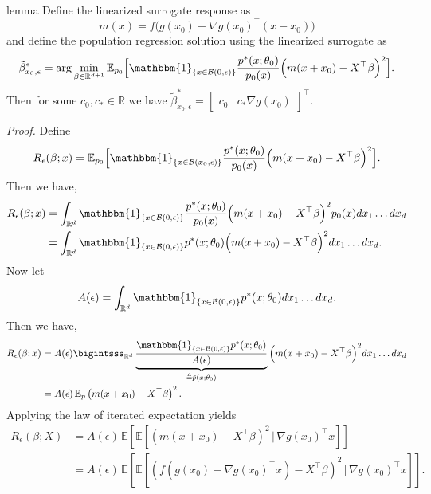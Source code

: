 \documentclass[11pt]{article}
\begin{document}
\begin{restatable}[Surrogate]{lemma}{} \label{lemma: surrogate problem} Define the linearized surrogate response as
\[m(x) = f\Big(g(x_0) + \nabla g(x_0)^{\top}(x-x_0)\Big)\]
and define the population regression solution using the linearized surrogate as 
\[\tilde{\beta}^*_{x_0, \epsilon} = \arg\min_{\beta \in \mathbb{R}^{d+1}}\mathbb{E}_{ p_{0}}\Big[\mathbbm{1}_{\{x \in \mathcal{B}(0, \epsilon)\}}\frac{p^*(x;\theta_0)}{p_{0}(x)}\Big(m(x + x_0) - X^{\top}\beta \Big)^2\Big].\]
Then for some $c_0, c_* \in \mathbb{R}$ we have $\tilde{\beta}^*_{x_0, \epsilon} = \begin{bmatrix}c_0  & c_*\nabla g(x_0) \end{bmatrix}^{\top}$. 
\end{restatable}
\noindent \textit{Proof.} Define 
\[R_{\epsilon}(\beta; x) = \mathbb{E}_{ p_{0}}\Big[\mathbbm{1}_{\{x \in \mathcal{B}(x_0, \epsilon)\}}\frac{p^*(x;\theta_0)}{p_{0}(x)}\Big(m(x + x_0) - X^{\top}\beta\Big)^2\Big].\]
Then we have,
\begin{align*}
    R_{\epsilon}(\beta; x)&= \int_{\mathbb{R}^d}\mathbbm{1}_{\{x \in \mathcal{B}(0, \epsilon)\}}\frac{p^*(x;\theta_0)}{p_{0}(x)}\Big(m(x+x_0) - X^{\top}\beta\Big)^2p_{0}(x) dx_1 \dots dx_d \\
    &= \int_{\mathbb{R}^d}\mathbbm{1}_{\{x \in \mathcal{B}(0, \epsilon)\}}p^*(x;\theta_0)\Big(m(x + x_0) - X^{\top}\beta \Big)^2 dx_1 \dots dx_d.
\end{align*}
Now let 
\begin{equation}
    A(\epsilon) = \int_{\mathbb{R}^d} \mathbbm{1}_{\{x \in \mathcal{B}(0, \epsilon)\}}p^*(x;\theta_0) dx_1 \dots dx_d.
\end{equation}
Then we have,
\begin{align*}
    R_{\epsilon}(\beta; x)&= A(\epsilon) \bigintsss_{\mathbb{R}^d}\underbrace{\frac{\mathbbm{1}_{\{x \in \mathcal{B}(0, \epsilon)\}}p^*(x;\theta_0)}{A(\epsilon)}}_{\triangleq \tilde{p}(x;\theta_0)}\Big(m(x+x_0) - X^{\top}\beta \Big)^2 dx_1 \dots dx_d \\
    &= A(\epsilon)\, \mathbb{E}_{ \tilde{p}}\left(m(x+x_0)-X^{\top}\beta\right)^2.
\end{align*}
Applying the law of iterated expectation yields
\begin{align*}
    R_{\epsilon}(\beta; X)&= A(\epsilon)\,\mathbb{E}\left[\mathbb{E}\left[\left(m(x+x_0)-X^{\top}\beta\right)^2 \, \Big| 
    \, \nabla g(x_0)^{\top}x\right]\right]\\
    &= A(\epsilon)\,\mathbb{E}\left[\mathbb{E}\left[\left(f\left(g(x_0) + \nabla g(x_0)^{\top}x\right)-X^{\top}\beta\right)^2 \, \Big| 
    \, \nabla g(x_0)^{\top}x\right]\right].
\end{align*}
\end{document}
